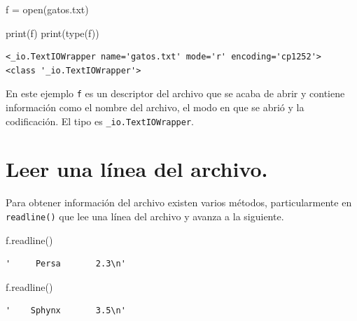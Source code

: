 \documentclass[
  spanish,
  letterpaper,
]{scrbook}
\newenvironment{Shaded}{\begin{snugshade}}{\end{snugshade}}
\newcommand{\BuiltInTok}[1]{\textcolor[rgb]{0.00,0.23,0.31}{#1}}
\newcommand{\NormalTok}[1]{\textcolor[rgb]{0.00,0.23,0.31}{#1}}
\newcommand{\OperatorTok}[1]{\textcolor[rgb]{0.37,0.37,0.37}{#1}}
\newcommand{\StringTok}[1]{\textcolor[rgb]{0.13,0.47,0.30}{#1}}
\theoremstyle{definition}
\theoremstyle{remark}
\begin{document}
\begin{Shaded}
\begin{Highlighting}[]
\NormalTok{f }\OperatorTok{=} \BuiltInTok{open}\NormalTok{(}\StringTok{\textquotesingle{}gatos.txt\textquotesingle{}}\NormalTok{)}
\end{Highlighting}
\end{Shaded}

\begin{Shaded}
\begin{Highlighting}[]
\BuiltInTok{print}\NormalTok{(f)}
\BuiltInTok{print}\NormalTok{(}\BuiltInTok{type}\NormalTok{(f))}
\end{Highlighting}
\end{Shaded}

\begin{verbatim}
<_io.TextIOWrapper name='gatos.txt' mode='r' encoding='cp1252'>
<class '_io.TextIOWrapper'>
\end{verbatim}

En este ejemplo \texttt{f} es un descriptor del archivo que se acaba de
abrir y contiene información como el nombre del archivo, el modo en que
se abrió y la codificación. El tipo es \texttt{\_io.TextIOWrapper}.

\section{Leer una línea del
archivo.}\label{leer-una-luxednea-del-archivo.}

Para obtener información del archivo existen varios métodos,
particularmente en \texttt{readline()} que lee una línea del archivo y
avanza a la siguiente.

\begin{Shaded}
\begin{Highlighting}[]
\NormalTok{f.readline()}
\end{Highlighting}
\end{Shaded}

\begin{verbatim}
'     Persa       2.3\n'
\end{verbatim}

\begin{Shaded}
\begin{Highlighting}[]
\NormalTok{f.readline()}
\end{Highlighting}
\end{Shaded}

\begin{verbatim}
'    Sphynx       3.5\n'
\end{verbatim}
\end{document}
